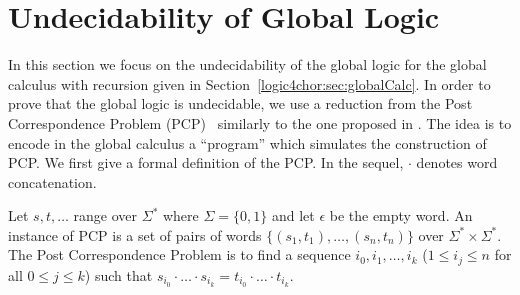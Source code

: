 \section{Undecidability of Global Logic} \label{logic4chor:sec:undecidability}
%
In this section we focus on the undecidability of the global logic for
the global calculus with recursion given in
Section~\ref{logic4chor:sec:globalCalc}.  In order to prove that the global logic
is undecidable, we use a reduction from the Post Correspondence
Problem (PCP)~\cite{Post:pcp} similarly to the one proposed in
\cite{ct:csl01}. The idea is to encode in the global calculus a
``program'' which simulates the construction of PCP.
%
We first give a formal definition of the PCP.  In the sequel, $\cdot$
denotes word concatenation.
%
\begin{definition}[PCP]
  Let $s,t,\ldots$ range over $\Sigma^*$ where $\Sigma = \{0, 1\}$ and
  let $\epsilon$ be the empty word.  An instance of PCP is a set of
  pairs of words $\{(s_1,t_1), \ldots, (s_n,t_n)\}$ over
  $\Sigma^*\times\Sigma^*$.  The Post Correspondence Problem is to
  find a sequence $i_0,i_1,\dots,i_k$ ($1 \leq i_j \leq n$ for all
  $0\leq j \leq k$) such that $s_{i_0}\cdot \ldots \cdot s_{i_k} =
  t_{i_0}\cdot \ldots \cdot t_{i_k}$.
\end{definition}

